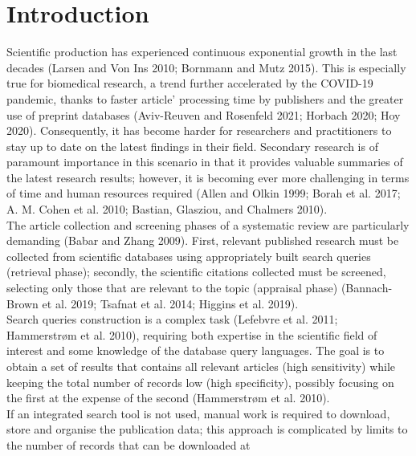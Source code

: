 \documentclass{article}
\begin{document}

\hypertarget{introduction}{%
\section{Introduction}\label{introduction}}

Scientific production has experienced continuous exponential growth in
the last decades (Larsen and Von Ins 2010; Bornmann and Mutz 2015). This
is especially true for biomedical research, a trend further accelerated
by the COVID-19 pandemic, thanks to faster article' processing time by
publishers and the greater use of preprint databases (Aviv-Reuven and
Rosenfeld 2021; Horbach 2020; Hoy 2020). Consequently, it has become
harder for researchers and practitioners to stay up to date on the
latest findings in their field. Secondary research is of paramount
importance in this scenario in that it provides valuable summaries of
the latest research results; however, it is becoming ever more
challenging in terms of time and human resources required (Allen and
Olkin 1999; Borah et al. 2017; A. M. Cohen et al. 2010; Bastian,
Glasziou, and Chalmers 2010).\\
The article collection and screening phases of a systematic review are
particularly demanding (Babar and Zhang 2009). First, relevant published
research must be collected from scientific databases using appropriately
built search queries (retrieval phase); secondly, the scientific
citations collected must be screened, selecting only those that are
relevant to the topic (appraisal phase) (Bannach-Brown et al. 2019;
Tsafnat et al. 2014; Higgins et al. 2019).\\
Search queries construction is a complex task (Lefebvre et al. 2011;
Hammerstrøm et al. 2010), requiring both expertise in the scientific
field of interest and some knowledge of the database query languages.
The goal is to obtain a set of results that contains all relevant
articles (high sensitivity) while keeping the total number of records
low (high specificity), possibly focusing on the first at the expense of
the second (Hammerstrøm et al. 2010).\\
If an integrated search tool is not used, manual work is required to
download, store and organise the publication data; this approach is
complicated by limits to the number of records that can be downloaded at
\end{document}
